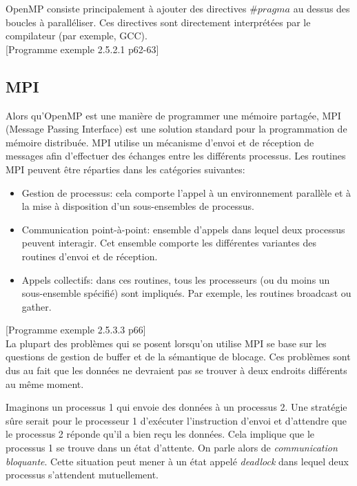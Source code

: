 	OpenMP consiste principalement à ajouter des directives $\#pragma$ au dessus des boucles à paralléliser. Ces directives sont directement interprétées par le compilateur (par exemple, GCC).\\
	
	[Programme exemple 2.5.2.1 p62-63]
	
	\subsection{MPI}
	Alors qu'OpenMP est une manière de programmer une mémoire partagée, MPI (Message Passing Interface) est une solution standard pour la programmation de mémoire distribuée. MPI utilise un mécanisme d'envoi et de réception de messages afin d'effectuer des échanges entre les différents processus. Les routines MPI peuvent être réparties dans les catégories suivantes:
	\begin{itemize}
	\item Gestion de processus: cela comporte l'appel à un environnement parallèle et à la mise à disposition d'un sous-ensembles de processus.
	\item Communication point-à-point: ensemble d'appels dans lequel deux processus peuvent interagir. Cet ensemble comporte les différentes variantes des routines d'envoi et de réception.
	\item Appels collectifs: dans ces routines, tous les processeurs (ou du moins un sous-ensemble spécifié) sont impliqués. Par exemple, les routines broadcast ou gather.\\
	\end{itemize}
	
	
	[Programme exemple 2.5.3.3 p66]\\
	
	
	La plupart des problèmes qui se posent lorsqu'on utilise MPI se base sur les questions de gestion de buffer et de la sémantique de blocage. Ces problèmes sont dus au fait que les données ne devraient pas se trouver à deux endroits différents au même moment.
	
	Imaginons un processus 1 qui envoie des données à un processus 2. Une stratégie sûre serait pour le processeur 1 d'exécuter l'instruction d'envoi et d'attendre que le processus 2 réponde qu'il a bien reçu les données. Cela implique que le processus 1 se trouve dans un état d'attente. On parle alors de \textit{communication bloquante}. Cette situation peut mener à un état appelé \textit{deadlock} dans lequel deux processus s'attendent mutuellement.
	

